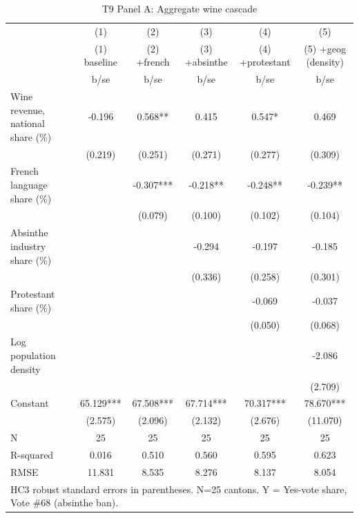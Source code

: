 \begin{table}[htbp]\centering
\def\sym#1{\ifmmode^{#1}\else\(^{#1}\)\fi}
\caption{T9 Panel A: Aggregate wine cascade \label{tab:T9\_A}}
\begin{tabular}{l*{5}{c}}
\toprule
            &\multicolumn{1}{c}{(1)}&\multicolumn{1}{c}{(2)}&\multicolumn{1}{c}{(3)}&\multicolumn{1}{c}{(4)}&\multicolumn{1}{c}{(5)}\\
            &\multicolumn{1}{c}{(1) baseline}&\multicolumn{1}{c}{(2) +french}&\multicolumn{1}{c}{(3) +absinthe}&\multicolumn{1}{c}{(4) +protestant}&\multicolumn{1}{c}{(5) +geog (density)}\\
            &        b/se   &        b/se   &        b/se   &        b/se   &        b/se   \\
\midrule
Wine revenue, national share (\%)&      -0.196   &       0.568** &       0.415   &       0.547*  &       0.469   \\
            &     (0.219)   &     (0.251)   &     (0.271)   &     (0.277)   &     (0.309)   \\
French language share (\%)&               &      -0.307***&      -0.218** &      -0.248** &      -0.239** \\
            &               &     (0.079)   &     (0.100)   &     (0.102)   &     (0.104)   \\
Absinthe industry share (\%)&               &               &      -0.294   &      -0.197   &      -0.185   \\
            &               &               &     (0.336)   &     (0.258)   &     (0.301)   \\
Protestant share (\%)&               &               &               &      -0.069   &      -0.037   \\
            &               &               &               &     (0.050)   &     (0.068)   \\
Log population density&               &               &               &               &      -2.086   \\
            &               &               &               &               &     (2.709)   \\
Constant    &      65.129***&      67.508***&      67.714***&      70.317***&      78.670***\\
            &     (2.575)   &     (2.096)   &     (2.132)   &     (2.676)   &    (11.070)   \\
\midrule
N           &          25   &          25   &          25   &          25   &          25   \\
R-squared   &       0.016   &       0.510   &       0.560   &       0.595   &       0.623   \\
RMSE        &      11.831   &       8.535   &       8.276   &       8.137   &       8.054   \\
\bottomrule
\multicolumn{6}{l}{\footnotesize HC3 robust standard errors in parentheses.  N=25 cantons.  Y = Yes-vote share, Vote \#68 (absinthe ban).}\\
\end{tabular}
\end{table}

